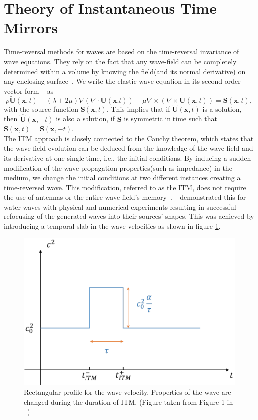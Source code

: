\section{Theory of Instantaneous Time Mirrors}\label{section:ITMTheory}
Time-reversal methods for waves are based on the time-reversal invariance of wave equations. They rely on the fact that any wave-field can be completely determined within
a volume by knowing the field(and its normal derivative) on any enclosing surface~\parencite{Bacot2016}. We write the elastic wave equation in its second order vector form
~\parencite[Cha. 2]{aki2002quantitative} as
\begin{equation}
    \rho \ddot{\mathbf{U}} \left( \mathbf{x}, t\right) - \left( \lambda + 2 \mu \right) \nabla \left(\nabla \cdot \mathbf{U}\left(\mathbf{x}. t\right)\right) 
    + \mu \nabla \times \left(\nabla \times \mathbf{U}\left(\mathbf{x},t\right)\right) = \mathbf{S}\left(\mathbf{x},t\right),
\end{equation}
with the source function $\mathbf{S}\left(\mathbf{x},t\right)$. This implies that if $\hat{\mathbf{U}}\left(\mathbf{x},t\right)$
is a solution, then $\hat{\mathbf{U}}\left(\mathbf{x}, -t\right)$ is also a solution, if $\mathbf{S}$ is symmetric in time such that 
$\mathbf{S}\left(\mathbf{x}, t\right) = \mathbf{S}\left(\mathbf{x}, -t\right)$. \\

The \ac{ITM} approach is closely connected to the Cauchy theorem, which states that the wave field evolution can be deduced from the knowledge of the wave field
and its derivative at one single time, i.e., the initial conditions. By inducing a sudden modification of the wave propagation properties(such as impedance) in the
medium, we change the initial conditions at two different instances creating a time-reversed wave. This modification, referred to as the \ac{ITM}, does not require the use of antennas or the entire wave field's memory~\parencite{Bacot2016}.
~\parencite{Bacot2016} demonstrated this for water waves with physical and numerical experiments resulting in successful refocusing of the generated waves into their
sources' shapes. This was achieved by introducing a temporal slab in the wave velocities as shown in figure \ref{fig:deltavelocity}.

\begin{figure}[!htpb]
    \centering
    \includegraphics[width=0.6\linewidth]{figures/delta_speed.png}
    \caption{Rectangular profile for the wave velocity. Properties of the wave are changed during the duration of \ac{ITM}. (Figure taken from Figure 1 in ~\parencite[Supplementary Material]{Bacot2016})}
    \label{fig:deltavelocity}
\end{figure}

